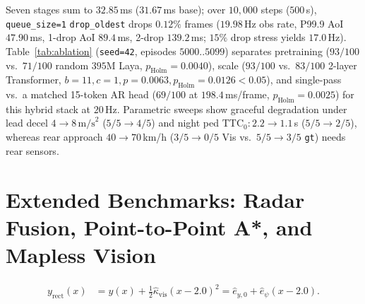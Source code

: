 \documentclass[10pt,twocolumn,letterpaper]{article}
\begin{document}
Seven stages sum to $32.85$\,ms ($31.67$\,ms base); over $10,000$ steps ($500$\,s), \texttt{queue\_size=1} \texttt{drop\_oldest} drops $0.12\%$ frames ($19.98$\,Hz obs rate, P99.9 AoI $47.90$\,ms, 1-drop AoI $89.4$\,ms, 2-drop $139.2$\,ms; $15\%$ drop stress yields $17.0$\,Hz). Table~\ref{tab:ablation} (\texttt{seed=42}, episodes $5000..5099$) separates pretraining ($93/100$ vs.\ $71/100$ random $395$M Laya, $p_{\text{Holm}}=0.0040$), scale ($93/100$ vs.\ $83/100$ 2-layer Transformer, $b=11,c=1, p=0.0063, p_{\text{Holm}}=0.0126 < 0.05$), and single-pass vs.\ a matched 15-token AR head ($69/100$ at $198.4$\,ms/frame, $p_{\text{Holm}}=0.0025$) for this hybrid stack at $20$\,Hz. Parametric sweeps show graceful degradation under lead decel $4 \to 8\,\text{m/s}^2$ ($5/5 \to 4/5$) and night ped $\text{TTC}_0: 2.2 \to 1.1$\,s ($5/5 \to 2/5$), whereas rear approach $40 \to 70$\,km/h ($3/5 \to 0/5$ Vis vs.\ $5/5 \to 3/5$ \texttt{gt}) needs rear sensors.

\section{Extended Benchmarks: Radar Fusion, Point-to-Point A*, and Mapless Vision}
\label{sec:extensions}
%
%
%
\begin{align}
    y_{\text{rect}}(x) &= y(x) + \frac{1}{2}\hat{\kappa}_{\text{vis}}(x - 2.0)^2 = \hat{e}_{y,0} + \hat{e}_\psi(x - 2.0).
\end{align}
\end{document}
